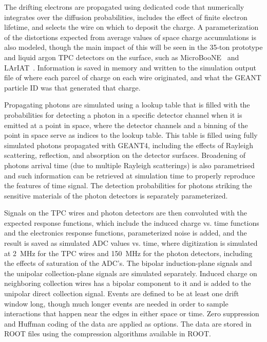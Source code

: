 
The drifting electrons are propagated using dedicated code that
numerically integrates over the diffusion probabilities, includes the
effect of finite electron lifetime, and selects the wire on which to
deposit the charge.  A parameterization of the distortions expected
from average values of space charge accumulations is also modeled,
though the main impact of this will be seen in the 35-ton prototype
and liquid argon TPC detectors on the surface, such as
MicroBooNE~\cite{microboone} and LArIAT~\cite{lariat}.  Information is
saved in memory and written to the simulation output file of where
each parcel of charge on each wire originated, and what the GEANT
particle ID was that generated that charge.

Propagating photons are simulated using a lookup table that is filled
with the probabilities for detecting a photon in a specific detector channel
when it is emitted at a point in space, where the detector channels
and a binning of the point in space serve as indices to the lookup table.
This table is filled using fully simulated photons propagated with GEANT4, including the effects
of Rayleigh scattering, reflection, and absorption on the detector
surfaces.  
Broadening of  photons arrival time (due to multiple Rayleigh scatterings)
is also parametrised and such information can be retrieved at simulation time
to properly reproduce the features of time signal.
The detection probabilities for photons striking the
sensitive materials of the photon detectors is separately
parameterized.

Signals on the TPC wires and photon detectors are then convoluted with
the expected response functions, which include the induced charge
vs. time functions and the electronics response functions,
parameterized noise is added, and the result is saved as simulated ADC
values vs. time, where digitization is simulated at 2~MHz for the TPC
wires and 150~MHz for the photon detectors, including the effects of
saturation of the ADC's.  The bipolar induction-plane signals and the
unipolar collection-plane signals are simulated separately.  Induced
charge on neighboring collection wires has a bipolar component to it
and is added to the unipolar direct collection signal.  Events are
defined to be at least one drift window long, though much longer
events are needed in order to sample interactions that happen near the
edges in either space or time.  Zero suppression and Huffman coding of
the data are applied as options.  The data are stored in ROOT files
using the compression algorithms available in ROOT.

